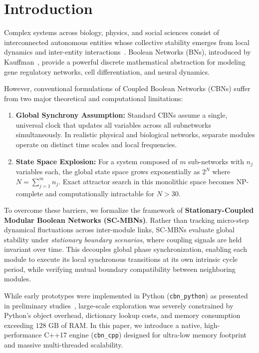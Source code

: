 \documentclass{svproc}
\begin{document}
\section{Introduction}
Complex systems across biology, physics, and social sciences consist of interconnected autonomous entities whose collective stability emerges from local dynamics and inter-entity interactions~\cite{arenas2008synchronization}. Boolean Networks (BNs), introduced by Kauffman~\cite{kauffman1969metabolic}, provide a powerful discrete mathematical abstraction for modeling gene regulatory networks, cell differentiation, and neural dynamics.

However, conventional formulations of Coupled Boolean Networks (CBNs) suffer from two major theoretical and computational limitations:
\begin{enumerate}
    \item \textbf{Global Synchrony Assumption:} Standard CBNs assume a single, universal clock that updates all variables across all subnetworks simultaneously. In realistic physical and biological networks, separate modules operate on distinct time scales and local frequencies.
    \item \textbf{State Space Explosion:} For a system composed of $m$ sub-networks with $n_j$ variables each, the global state space grows exponentially as $2^N$ where $N = \sum_{j=1}^m n_j$. Exact attractor search in this monolithic space becomes NP-complete and computationally intractable for $N > 30$.
\end{enumerate}

To overcome these barriers, we formalize the framework of \textbf{Stationary-Coupled Modular Boolean Networks (SC-MBNs)}. Rather than tracking micro-step dynamical fluctuations across inter-module links, SC-MBNs evaluate global stability under \emph{stationary boundary scenarios}, where coupling signals are held invariant over time. This decouples global phase synchronization, enabling each module to execute its local synchronous transitions at its own intrinsic cycle period, while verifying mutual boundary compatibility between neighboring modules.

While early prototypes were implemented in Python (\texttt{cbn\_python}) as presented in preliminary studies~\cite{tovar2022method,rozante2022efficient}, large-scale exploration was severely constrained by Python's object overhead, dictionary lookup costs, and memory consumption exceeding $128\text{~GB}$ of RAM. In this paper, we introduce a native, high-performance C++17 engine (\texttt{cbn\_cpp}) designed for ultra-low memory footprint and massive multi-threaded scalability.
\end{document}
